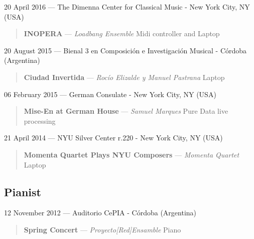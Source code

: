 \documentclass[12pt,overlapped]{res}%
\begin{document}
\begin{resume}
20 April 2016 --- The Dimenna Center for Classical Music - New York City, NY (USA)%
\begin{quote}
\par
\textbf{INOPERA} --- \textit{Loadbang Ensemble}
Midi controller and Laptop
\end{quote}%
%
%
%
20 August 2015 --- Bienal 3 en Composición e Investigación Musical - Córdoba (Argentina)%
\begin{quote}
\par
\textbf{Ciudad Invertida} --- \textit{Rocío Elizalde y Manuel Pastrana}
Laptop
\end{quote}%
%
%
%
06 February 2015 --- German Consulate - New York City, NY (USA)%
\begin{quote}
\par
\textbf{Mise{-}En at German House} --- \textit{Samuel Marques}
Pure Data live processing
\end{quote}%
%
%
%
21 April 2014 --- NYU Silver Center r.220 - New York City, NY (USA)%
\begin{quote}
\par
\textbf{Momenta Quartet Plays NYU Composers} --- \textit{Momenta Quartet}
Laptop
\end{quote}%
%
%
%


%
%
%


%
%
%
\subsection{Pianist}%
12 November 2012 --- Auditorio CePIA - Córdoba (Argentina)%
\begin{quote}
\par
\textbf{Spring Concert} --- \textit{Proyecto{[}Red{]}Ensamble}
Piano
\end{quote}%


\end{resume}
\end{document}
